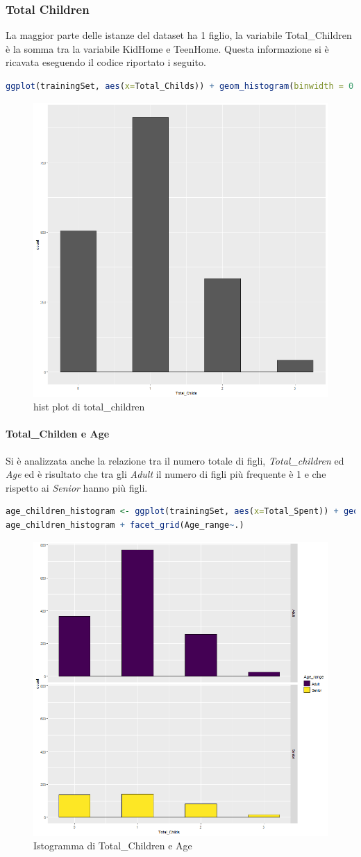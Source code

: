 \documentclass[letterpaper,11pt]{article}
\begin{document}
\newpage
\subsubsection{Total Children}
La maggior parte delle istanze del dataset ha 1 figlio, la variabile Total\_Children è la somma tra la variabile KidHome e TeenHome. Questa informazione si è ricavata eseguendo il codice riportato i seguito.\\

\begin{lstlisting}[language=R]
ggplot(trainingSet, aes(x=Total_Childs)) + geom_histogram(binwidth = 0.5, colour = "Black")
\end{lstlisting}

\begin{figure}[h]
    \centering
    \includegraphics[width=.4\textwidth]{Img/EDA/EDA015.png}
    \caption{hist plot di total\_children }
    \label{fig:IstogrammaTc}
\end{figure}

\paragraph{Total\_Childen e Age}
Si è analizzata anche la relazione tra il numero totale di figli, \textit{Total\_children} ed \textit{Age} ed è risultato che tra gli \textit{Adult} il numero di figli più frequente è 1 e che rispetto ai \textit{Senior} hanno più figli.

\begin{lstlisting}[language=R]
age_children_histogram <- ggplot(trainingSet, aes(x=Total_Spent)) + geom_histogram(aes(fill=Age_range), binwidth = 0.5, colour = "Black")
age_children_histogram + facet_grid(Age_range~.)
\end{lstlisting}
\begin{figure}[h]
    \centering
    \includegraphics[width=.45\textwidth]{Img/EDA/EDA016.png}
    \caption{Istogramma di Total\_Children e Age}
    \label{fig:IstogrammaTcAge}
\end{figure}
\newpage
\end{document}
